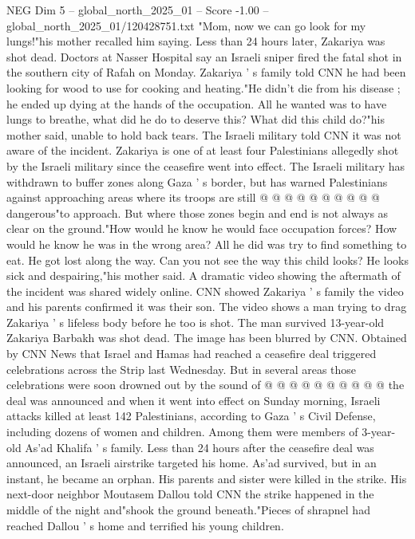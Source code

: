 \begin{textsample}{NEG Dim 5 – global\_north\_2025\_01 – Score -1.00 – global\_north\_2025\_01/120428751.txt}  \label{ex:f5_neg_077}
"Mom, now we can go look for my lungs!"his mother recalled him saying.
Less than 24 hours later, Zakariya was shot dead.
Doctors at Nasser Hospital say an Israeli sniper fired the fatal shot in the southern city of Rafah on Monday.
Zakariya ' s family told CNN he had been looking for wood to use for cooking and heating."He didn't die from his disease ; he ended up dying at the hands of the occupation.
All he wanted was to have lungs to breathe, what did he do to deserve this?
What did this child do?"his mother said, unable to hold back tears.
The Israeli military told CNN it was not aware of the incident.
Zakariya is one of at least four Palestinians allegedly shot by the Israeli military since the ceasefire went into effect.
The Israeli military has withdrawn to buffer zones along Gaza ' s border, but has warned Palestinians against approaching areas where its troops are still @ @ @ @ @ @ @ @ @ @ dangerous"to approach.
But where those zones begin and end is not always as clear on the ground."How would he know he would face occupation forces?
How would he know he was in the wrong area?
All he did was try to find something to eat.
He got lost along the way.
Can you not see the way this child looks?
He looks sick and despairing,"his mother said.
A dramatic video showing the aftermath of the incident was shared widely online.
CNN showed Zakariya ' s family the video and his parents confirmed it was their son.
The video shows a man trying to drag Zakariya ' s lifeless body before he too is shot.
The man survived 13-year-old Zakariya Barbakh was shot dead.
The image has been blurred by CNN.
Obtained by CNN News that Israel and Hamas had reached a ceasefire deal triggered celebrations across the Strip last Wednesday.
But in several areas those celebrations were soon drowned out by the sound of @ @ @ @ @ @ @ @ @ @ the deal was announced and when it went into effect on Sunday morning, Israeli attacks killed at least 142 Palestinians, according to Gaza ' s Civil Defense, including dozens of women and children.
Among them were members of 3-year-old As'ad Khalifa ' s family.
Less than 24 hours after the ceasefire deal was announced, an Israeli airstrike targeted his home.
As'ad survived, but in an instant, he became an orphan.
His parents and sister were killed in the strike.
His next-door neighbor Moutasem Dallou told CNN the strike happened in the middle of the night and"shook the ground beneath."Pieces of shrapnel had reached Dallou ' s home and terrified his young children.

\end{textsample}
